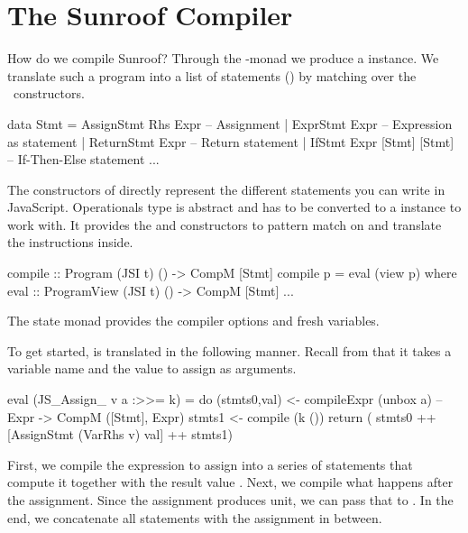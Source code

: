  
\section{The Sunroof Compiler}
\label{sec:compiler}

How do we compile Sunroof?
Through the \JS-monad we produce a  instance. We 
translate such a program into a list of statements () by matching over 
the \JSI~constructors.
\begin{Code}
data Stmt = AssignStmt Rhs Expr       -- Assignment
          | ExprStmt Expr             -- Expression as statement
          | ReturnStmt Expr           -- Return statement
          | IfStmt Expr [Stmt] [Stmt] -- If-Then-Else statement
          ...
\end{Code}
The constructors of  directly represent the 
different statements you can write in JavaScript.
%
Operationals \cite{Apfelmus:10:Operational,Hackage:10:Operational} 
 type is abstract and has to be converted 
to a  instance to work with.
It provides the \Src{:>>=} and  constructors 
to pattern match on and translate the instructions inside.
\begin{Code}
compile :: Program (JSI t) () -> CompM [Stmt]
compile p = eval (view p)
  where eval :: ProgramView (JSI t) () -> CompM [Stmt]
        ...
\end{Code}
The  state monad provides the compiler options and fresh variables.

To get started,  is translated in the following manner. 
Recall from 
 that it takes a variable name 
and the value to assign as arguments. %
\begin{Code}
eval (JS_Assign_ v a :>>= k) = do
  (stmts0,val) <- compileExpr (unbox a) -- Expr -> CompM ([Stmt], Expr)
  stmts1       <- compile (k ())
  return ( stmts0 ++ [AssignStmt (VarRhs v) val] ++ stmts1)
\end{Code}
First, we compile the expression  to assign into a series of 
statements that compute it together with the result value .
Next, we compile what happens after the assignment. Since 
the assignment produces unit, we can pass that to .
In the end, we concatenate all statements with the assignment in between. 

